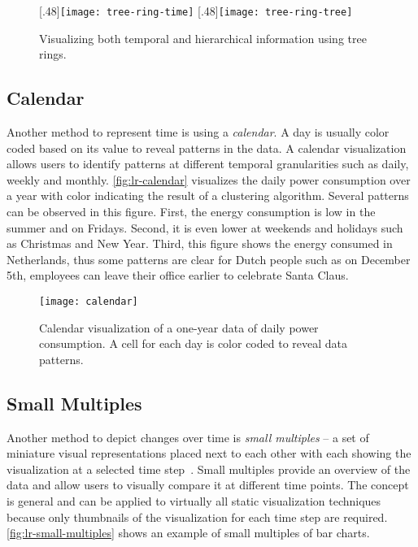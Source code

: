 \begin{figure}[!htb]
\centering
{}[.48\columnwidth]{\texttt{[image: tree-ring-time]}}
\hfill
{}[.48\columnwidth]{\texttt{[image: tree-ring-tree]}}
\caption{Visualizing both temporal and hierarchical information using tree rings. }
\end{figure}

\subsection{Calendar}
Another method to represent time is using a \emph{calendar}. A day is usually color coded based on its value to reveal patterns in the data. A calendar visualization allows users to identify patterns at different temporal granularities such as daily, weekly and monthly.  \autoref{fig:lr-calendar} visualizes the daily power consumption over a year with color indicating the result of a clustering algorithm. Several patterns can be observed in this figure. First, the energy consumption is low in the summer and on Fridays. Second, it is even lower at weekends and holidays such as Christmas and New Year. Third, this figure shows the energy consumed in Netherlands, thus some patterns are clear for Dutch people such as on December 5th, employees can leave their office earlier to celebrate Santa Claus.

\begin{figure}[!htb]
	\centering
	\texttt{[image: calendar]}
	\caption{Calendar visualization of a one-year data of daily power consumption. A cell for each day is color coded to reveal data patterns. }
	\label{fig:lr-calendar}
\end{figure}

\subsection{Small Multiples}
Another method to depict changes over time is \emph{small multiples} -- a set of miniature visual representations placed next to each other with each showing the visualization at a selected time step~\cite{Tufte1983}. Small multiples provide an overview of the data and allow users to visually compare it at different time points. The concept is general and can be applied to virtually all static visualization techniques because only thumbnails of the visualization for each time step are required. \autoref{fig:lr-small-multiples} shows an example of small multiples of bar charts.

